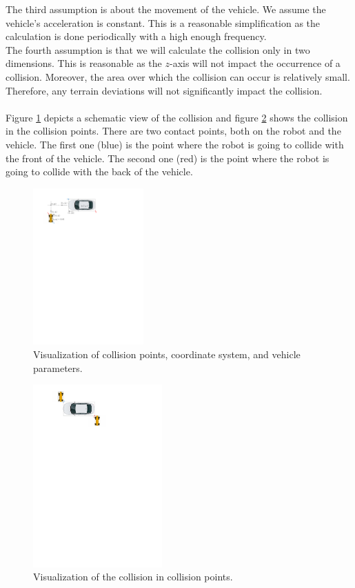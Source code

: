         The third assumption is about the movement of the vehicle. We assume the vehicle's acceleration is constant. This is a reasonable simplification as the calculation is done periodically with a high enough frequency.\\
        The fourth assumption is that we will calculate the collision only in two dimensions. This is reasonable as the $z$-axis will not impact the occurrence of a collision. Moreover, the area over which the collision can occur is relatively small. Therefore, any terrain deviations will not significantly impact the collision.\\\\
        Figure \ref{fig:collision} depicts a schematic view of the collision and figure \ref{fig:collided} shows the collision in the collision points. There are two contact points, both on the robot and the vehicle. The first one (blue) is the point where the robot is going to collide with the front of the vehicle. The second one (red) is the point where the robot is going to collide with the back of the vehicle.\\
        \begin{figure}[ht]
            \centering
            \includegraphics[height=6cm]{images/collision.pdf}
            \caption{Visualization of collision points, coordinate system, and vehicle parameters.}
            \label{fig:collision}
        \end{figure}
        \begin{figure}[ht]
            \centering
            \includegraphics[height=7cm]{images/collided.pdf}
            \caption{Visualization of the collision in collision points.}
            \label{fig:collided}
        \end{figure}
